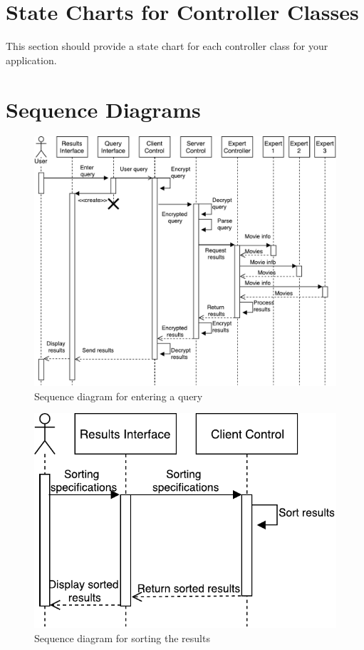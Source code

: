 \documentclass[]{article}
\begin{document}
\section{State Charts for Controller Classes}
\label{sec:state_charts_for_controller_classes}
This section should provide a state chart for each controller class for your application.

\section{Sequence Diagrams}
\label{sec:sequence_diagrams}
\begin{figure}[H]
	\includegraphics[width=\textwidth]{SD1}
	\centering
	\caption{Sequence diagram for entering a query}
\end{figure}

\begin{figure}[H]
	\includegraphics[width=\textwidth]{SD2}
	\centering
	\caption{Sequence diagram for sorting the results}
\end{figure}
\end{document}
